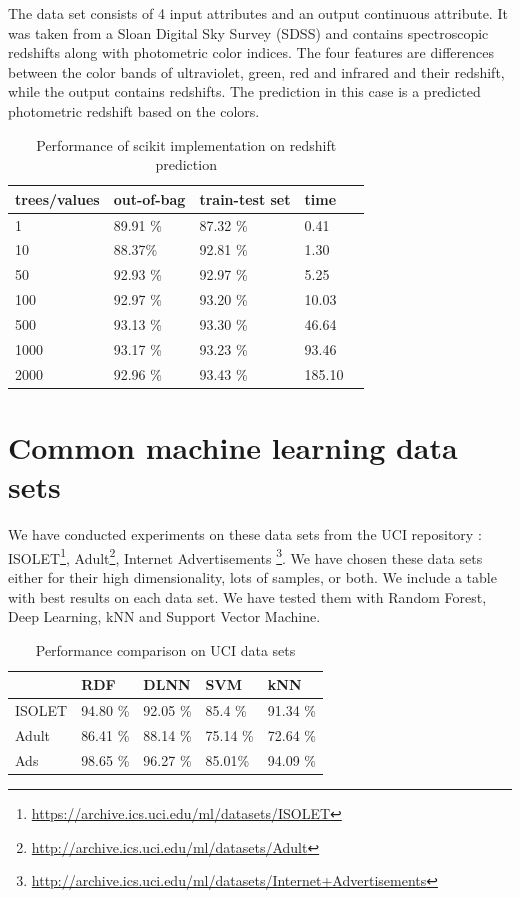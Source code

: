 \documentclass[thesis=B,english]{FITthesis}[2012/10/20]
\begin{document}
The data set consists of 4 input attributes and an output continuous attribute. It was taken from a Sloan Digital Sky Survey (SDSS) and contains spectroscopic redshifts along with photometric color indices. The four features are differences between the color bands of ultraviolet, green, red and infrared and their redshift, while the output contains redshifts. The prediction in this case is a predicted photometric redshift based on the colors.
\begin{table}[h]
\begin{tabular}{|l|l|l|l|l|}
\hline
trees/values & out-of-bag & train-test set & time \\ \hline
1            &89.91 \%                   &87.32 \%                & 0.41          \\ \hline
10           &88.37\%                    &92.81 \%                &1.30           \\ \hline
50           &92.93 \%                   &92.97 \%                &5.25        \\ \hline
100          &92.97 \%                   &93.20 \%                &10.03        \\ \hline
500          &93.13 \%                   &93.30 \%                &46.64      \\ \hline
1000         &93.17 \%                   &93.23 \%                &93.46         \\ \hline
2000         &92.96 \%                   &93.43 \%                &185.10        \\ \hline
\end{tabular}
\caption{Performance of scikit implementation on redshift prediction}
\label{tab:scikit-redshift}
\end{table}
\section{Common machine learning data sets}
We have conducted experiments on these data sets from the UCI repository \cite{uci} : ISOLET\footnote{\url{https://archive.ics.uci.edu/ml/datasets/ISOLET}}, Adult\footnote{\url{http://archive.ics.uci.edu/ml/datasets/Adult}}, Internet Advertisements \footnote{\url{http://archive.ics.uci.edu/ml/datasets/Internet+Advertisements}}. We have chosen these data sets either for their high dimensionality, lots of samples, or both. We include a table with best results on each data set. We have tested them with Random Forest, Deep Learning, kNN and Support Vector Machine. 
\begin{table}[h]
    \begin{tabular}{|l|l|l|l|l|}
    \hline
    ~      & RDF      & DLNN     & SVM     & kNN     \\ \hline
    ISOLET & 94.80 \% & 92.05 \% & 85.4 \% & 91.34 \%   \\ \hline
    Adult  & 86.41 \% & 88.14 \% & 75.14 \%  & 72.64 \%  \\ \hline
    Ads    & 98.65 \% & 96.27 \% & 85.01\% & 94.09 \% \\ \hline
    \end{tabular}
    \caption{Performance comparison on UCI data sets}
\end{table}
\end{document}
